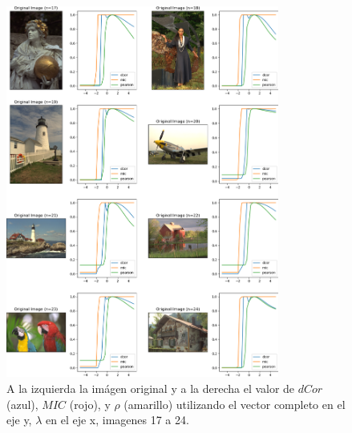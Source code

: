 \begin{figure}
    \centering
    \includegraphics[width=0.8\textwidth]{figuras/full_comp_3.png}
    \caption{A la izquierda la im\'agen original y a la derecha el valor de $dCor$ (azul), $MIC$ (rojo), y $\rho$ (amarillo) utilizando el vector completo en el eje y, $\lambda$ en el eje x, imagenes 17 a 24.}
\end{figure}

